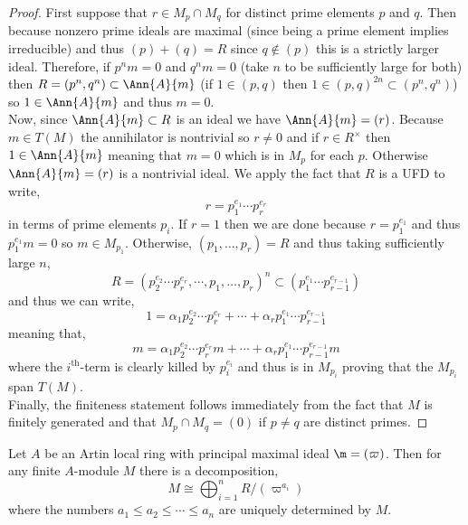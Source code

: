 \documentclass[12pt]{article}
\begin{document}
\begin{proof}
First suppose that $r \in M_p \cap M_q$ for distinct prime elements $p$ and $q$. Then because nonzero prime ideals are maximal (since being a prime element implies irreducible) and thus $(p) + (q) = R$ since $q \notin (p)$ this is a strictly larger ideal. Therefore, if $p^n m = 0$ and $q^n m = 0$ (take $n$ to be sufficiently large for both) then $R = (p^n, q^n) \subset \Ann{A}{m}$ (if $1 \in (p, q)$ then $1 \in (p,q)^{2n} \subset (p^n, q^n)$) so $1 \in \Ann{A}{m}$ and thus $m = 0$.
\bigskip\\
Now, since $\Ann{A}{m} \subset R$ is an ideal we have $\Ann{A}{m} = (r)$. Because $m \in T(M)$ the annihilator is nontrivial so $r \neq 0$ and if $r \in R^\times$ then $1 \in \Ann{A}{m}$ meaning that $m = 0$ which is in $M_p$ for each $p$. Otherwise $\Ann{A}{m} = (r)$ is a nontrivial ideal. We apply the fact that $R$ is a UFD to write,
\[ r = p_1^{e_1} \cdots p_r^{e_r} \]
in terms of prime elements $p_i$. If $r = 1$ then we are done because $r = p_1^{e_1}$ and thus $p_1^{e_1} m = 0$ so $m \in M_{p_1}$. Otherwise, $(p_1, \dots, p_r) = R$ and thus taking sufficiently large $n$,
\[ R = (p_2^{e_2} \cdots p_r^{e_r}, \cdots, p_1, \dots, p_r)^n \subset (p_1^{e_1} \cdots p_{r-1}^{e_{r-1}}) \]
and thus we can write,
\[ 1 = \alpha_1 p_2^{e_2} \cdots p_r^{e_r} + \cdots + \alpha_r p_1^{e_1} \cdots p_{r-1}^{e_{r-1}} \]
meaning that,
\[ m = \alpha_1 p_2^{e_2} \cdots p_r^{e_r} m + \cdots + \alpha_r p_1^{e_1} \cdots p_{r-1}^{e_{r-1}} m  \]
where the $i^{\mathrm{th}}$-term is clearly killed by $p_i^{e_i}$ and thus is in $M_{p_i}$ proving that the $M_{p_i}$ span $T(M)$. 
\bigskip\\
Finally, the finiteness statement follows immediately from the fact that $M$ is finitely generated and that $M_p \cap M_q = (0)$ if $p \neq q$ are distinct primes.
\end{proof}

\begin{lemma}
Let $A$ be an Artin local ring with principal maximal ideal $\m = (\varpi)$. Then for any finite $A$-module $M$ there is a decomposition,
\[ M \cong \bigoplus_{i = 1}^n R / (\varpi^{a_i}) \]
where the numbers $a_1 \le a_2 \le \cdots \le a_n$ are uniquely determined by $M$.
\end{lemma}
\end{document}
